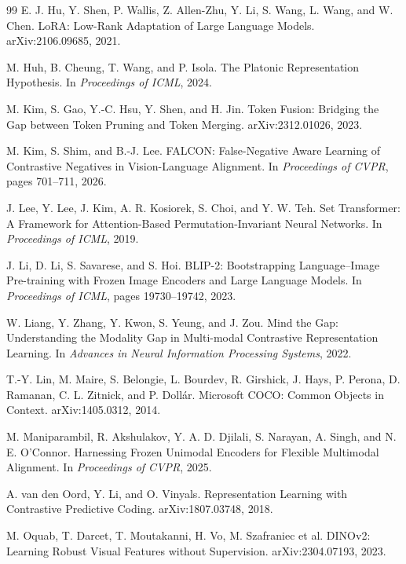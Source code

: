 \documentclass[11pt,a4paper]{article}
\begin{document}
\begin{thebibliography}{99}
E. J. Hu, Y. Shen, P. Wallis, Z. Allen-Zhu, Y. Li, S. Wang, L. Wang, and
W. Chen.
\newblock LoRA: Low-Rank Adaptation of Large Language Models.
\newblock arXiv:2106.09685, 2021.

M. Huh, B. Cheung, T. Wang, and P. Isola.
\newblock The Platonic Representation Hypothesis.
\newblock In \emph{Proceedings of ICML}, 2024.

M. Kim, S. Gao, Y.-C. Hsu, Y. Shen, and H. Jin.
\newblock Token Fusion: Bridging the Gap between Token Pruning and Token Merging.
\newblock arXiv:2312.01026, 2023.

M. Kim, S. Shim, and B.-J. Lee.
\newblock FALCON: False-Negative Aware Learning of Contrastive Negatives in
Vision-Language Alignment.
\newblock In \emph{Proceedings of CVPR}, pages 701--711, 2026.

J. Lee, Y. Lee, J. Kim, A. R. Kosiorek, S. Choi, and Y. W. Teh.
\newblock Set Transformer: A Framework for Attention-Based
Permutation-Invariant Neural Networks.
\newblock In \emph{Proceedings of ICML}, 2019.

J. Li, D. Li, S. Savarese, and S. Hoi.
\newblock BLIP-2: Bootstrapping Language--Image Pre-training with Frozen Image
Encoders and Large Language Models.
\newblock In \emph{Proceedings of ICML}, pages 19730--19742, 2023.

W. Liang, Y. Zhang, Y. Kwon, S. Yeung, and J. Zou.
\newblock Mind the Gap: Understanding the Modality Gap in Multi-modal
Contrastive Representation Learning.
\newblock In \emph{Advances in Neural Information Processing Systems}, 2022.

T.-Y. Lin, M. Maire, S. Belongie, L. Bourdev, R. Girshick, J. Hays, P. Perona,
D. Ramanan, C. L. Zitnick, and P. Doll\'ar.
\newblock Microsoft COCO: Common Objects in Context.
\newblock arXiv:1405.0312, 2014.

M. Maniparambil, R. Akshulakov, Y. A. D. Djilali, S. Narayan, A. Singh, and
N. E. O'Connor.
\newblock Harnessing Frozen Unimodal Encoders for Flexible Multimodal Alignment.
\newblock In \emph{Proceedings of CVPR}, 2025.

A. van den Oord, Y. Li, and O. Vinyals.
\newblock Representation Learning with Contrastive Predictive Coding.
\newblock arXiv:1807.03748, 2018.

M. Oquab, T. Darcet, T. Moutakanni, H. Vo, M. Szafraniec et al.
\newblock DINOv2: Learning Robust Visual Features without Supervision.
\newblock arXiv:2304.07193, 2023.


\end{thebibliography}
\end{document}
